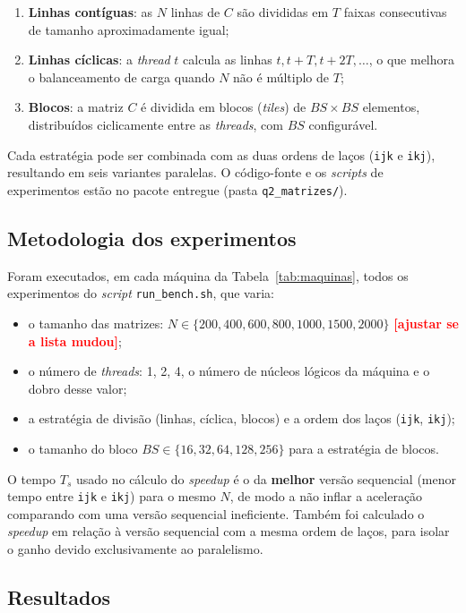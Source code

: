 \documentclass[12pt]{article}
\newcommand{\todo}[1]{\textcolor{red}{\textbf{[#1]}}}
\begin{document}
\begin{enumerate}
  \item \textbf{Linhas contíguas}: as $N$ linhas de $C$ são divididas em $T$ faixas consecutivas de tamanho aproximadamente igual;
  \item \textbf{Linhas cíclicas}: a \textit{thread} $t$ calcula as linhas $t, t+T, t+2T, \ldots$, o que melhora o balanceamento de carga quando $N$ não é múltiplo de $T$;
  \item \textbf{Blocos}: a matriz $C$ é dividida em blocos (\textit{tiles}) de $BS \times BS$ elementos, distribuídos ciclicamente entre as \textit{threads}, com $BS$ configurável.
\end{enumerate}

Cada estratégia pode ser combinada com as duas ordens de laços (\texttt{ijk} e \texttt{ikj}), resultando em seis variantes paralelas. O código-fonte e os \textit{scripts} de experimentos estão no pacote entregue (pasta \texttt{q2\_matrizes/}).

\subsection{Metodologia dos experimentos}

Foram executados, em cada máquina da Tabela~\ref{tab:maquinas}, todos os experimentos do \textit{script} \texttt{run\_bench.sh}, que varia:
\begin{itemize}
  \item o tamanho das matrizes: $N \in \{200, 400, 600, 800, 1000, 1500, 2000\}$ \todo{ajustar se a lista mudou};
  \item o número de \textit{threads}: 1, 2, 4, o número de núcleos lógicos da máquina e o dobro desse valor;
  \item a estratégia de divisão (linhas, cíclica, blocos) e a ordem dos laços (\texttt{ijk}, \texttt{ikj});
  \item o tamanho do bloco $BS \in \{16, 32, 64, 128, 256\}$ para a estratégia de blocos.
\end{itemize}
O tempo $T_s$ usado no cálculo do \textit{speedup} é o da \textbf{melhor} versão sequencial (menor tempo entre \texttt{ijk} e \texttt{ikj}) para o mesmo $N$, de modo a não inflar a aceleração comparando com uma versão sequencial ineficiente. Também foi calculado o \textit{speedup} em relação à versão sequencial com a mesma ordem de laços, para isolar o ganho devido exclusivamente ao paralelismo.

\subsection{Resultados}
\end{document}
